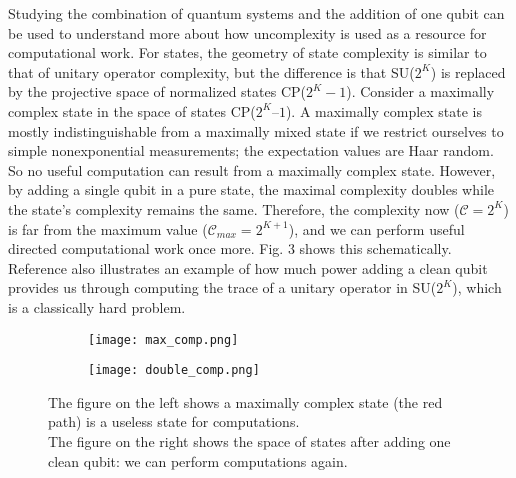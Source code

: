 Studying the combination of quantum systems and the addition of one qubit can be used to understand more about how uncomplexity is used as a resource for computational work. For states, the geometry of state complexity is similar to that of unitary operator complexity, but the difference is that SU($2^K$) is replaced by the projective space of normalized states CP($2^K-1$). Consider a maximally complex state in the space of states CP($2^K – 1$). A maximally complex state is mostly indistinguishable from a maximally mixed state if we restrict ourselves to simple nonexponential measurements; the expectation values are Haar random. So no useful computation can result from a maximally complex state. However, by adding a single qubit in a pure state, the maximal complexity doubles while the state’s complexity remains the same. Therefore, the complexity now ($\mathcal{C} = 2^K$) is far from the maximum value ($\mathcal{C}_{max} = 2^{K+1}$), and we can perform useful directed computational work once more. Fig. 3 shows this schematically. Reference \cite{brown2018second} also illustrates an example of how much power adding a clean qubit provides us through computing the trace of a unitary operator in SU($2^K$), which is a classically hard problem. 
 
\begin{figure}[h!]
 \begin{framed}
  \centering
  \begin{subfigure}[b]{0.45\linewidth}
   \texttt{[image: max\_comp.png]}
  \end{subfigure}
  \begin{subfigure}[b]{0.45\linewidth}
   \texttt{[image: double\_comp.png]}
  \end{subfigure}
  \end{framed}
  \caption{The figure on the left shows a maximally complex state (the red path) is a useless state for computations.
\\
The figure on the right shows the space of states after adding one clean qubit: we can perform computations again.}
\end{figure}
 
